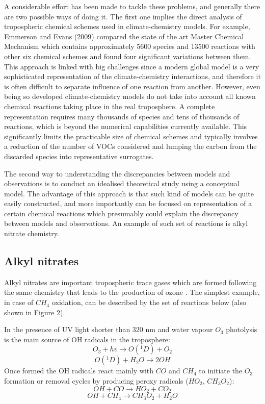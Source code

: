 \documentclass[11pt,a4paper]{article}
\begin{document}
A considerable effort has been made to tackle these problems, and generally there are two possible ways of doing it. The first one implies the direct analysis of tropospheric chemical schemes used in climate-chemistry models. For example, Emmerson and Evans (2009) compared the state of the art Master Chemical Mechanism which contains approximately 5600 species and 13500 reactions \citep{Jenkin2002} with other six chemical schemes and found four significant variations between them. This approach is linked with big challenges since a modern global model is a very sophisticated representation of the climate-chemistry interactions, and therefore it is often difficult to separate influence of one reaction from another. However, even being so developed climate-chemistry models do not take into account all known chemical reactions taking place in the real troposphere. A complete representation requires many thousands of species and tens of thousands of reactions, which is beyond the numerical capabilities currently available. This significantly limits the practicable size of chemical schemes and typically involves a reduction of the number of VOCs considered and lumping the carbon from the discarded species into representative surrogates.

The second way to understanding the discrepancies between models and observations is to conduct an idealised theoretical study using a conceptual model. The advantage of this approach is that such kind of models can be quite easily constructed, and more importantly can be focused on representation of a certain chemical reactions which presumably could explain the discrepancy between models and observations. An example of such set of reactions is alkyl nitrate chemistry.

\subsection{Alkyl nitrates}
Alkyl nitrates are important tropospheric trace gases which are formed following the same chemistry that leads to the production of ozone \citep{Reeves2007}. The simplest example, in case of $CH_4$ oxidation, can be described by the set of reactions below (also shown in Figure 2).

%

In the presence of UV light shorter than 320 nm and water vapour $O_3$ photolysis is the main source of OH radicals in the troposphere:
\begin{equation} \label{eq:O3hv}
O_3 + hv \rightarrow O(^1D) + O_2
\end{equation}
\begin{equation} \label{eq:O1D+H2O}
O(^1D) + H_2O \rightarrow 2OH
\end{equation}
Once formed the OH radicals react mainly with $CO$ and $CH_4$ to initiate the $O_3$ formation or removal cycles by producing peroxy radicals ($HO_2$, $CH_3O_2$):
\begin{equation} \label{eq:OH+CO}
OH + CO \rightarrow HO_2 + CO_2
\end{equation}
\begin{equation} \label{eq:OH+CH4}
OH + CH_4 \rightarrow CH_3O_2 + H_2O
\end{equation}
\end{document}
